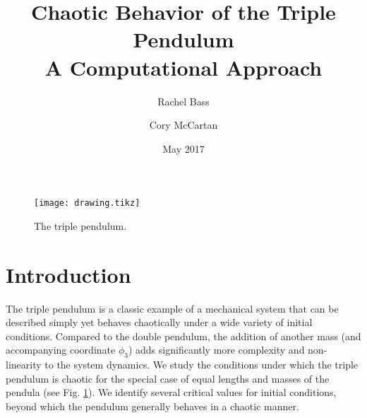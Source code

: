 \documentclass{article}
\title{Chaotic Behavior of the Triple Pendulum \\
    \large A Computational Approach }
\author{Rachel Bass \and Cory McCartan}
\date{May 2017}
\begin{document}
\maketitle

\begin{figure}
	\centering
	\texttt{[image: drawing.tikz]}
    \caption{The triple pendulum.} 
    \label{fig:pendulum}
\end{figure}

\section{Introduction}
The triple pendulum is a classic example of a mechanical system that can be
described simply yet behaves chaotically under a wide variety of initial
conditions. Compared to the double pendulum, the addition of another mass (and
accompanying coordinate $\phi_3$) adds significantly more complexity and
non-linearity to the system dynamics. We study the conditions under which the
triple pendulum is chaotic for the special case of equal lengths and masses of
the pendula (see Fig. \ref{fig:pendulum}). We identify several critical
values for initial conditions, beyond which the pendulum generally behaves in a
chaotic manner.
\end{document}

